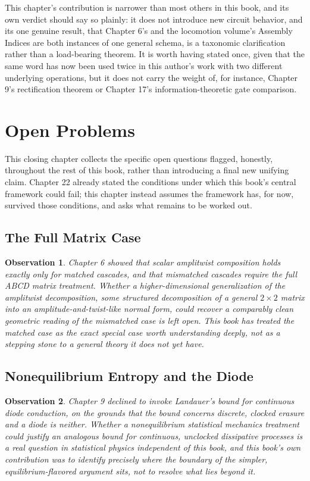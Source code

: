 \documentclass[12pt]{article}
\newtheorem{observation}{Observation}
\begin{document}
This chapter's contribution is narrower than most others in this book, and its own verdict should say so plainly: it does not introduce new circuit behavior, and its one genuine result, that Chapter 6's and the locomotion volume's Assembly Indices are both instances of one general schema, is a taxonomic clarification rather than a load-bearing theorem. It is worth having stated once, given that the same word has now been used twice in this author's work with two different underlying operations, but it does not carry the weight of, for instance, Chapter 9's rectification theorem or Chapter 17's information-theoretic gate comparison.

\section{Open Problems}

This closing chapter collects the specific open questions flagged, honestly, throughout the rest of this book, rather than introducing a final new unifying claim. Chapter 22 already stated the conditions under which this book's central framework could fail; this chapter instead assumes the framework has, for now, survived those conditions, and asks what remains to be worked out.

\subsection{The Full Matrix Case}

\begin{observation}
Chapter 6 showed that scalar amplitwist composition holds exactly only for matched cascades, and that mismatched cascades require the full ABCD matrix treatment. Whether a higher-dimensional generalization of the amplitwist decomposition, some structured decomposition of a general $2\times2$ matrix into an amplitude-and-twist-like normal form, could recover a comparably clean geometric reading of the mismatched case is left open. This book has treated the matched case as the exact special case worth understanding deeply, not as a stepping stone to a general theory it does not yet have.
\end{observation}

\subsection{Nonequilibrium Entropy and the Diode}

\begin{observation}
Chapter 9 declined to invoke Landauer's bound for continuous diode conduction, on the grounds that the bound concerns discrete, clocked erasure and a diode is neither. Whether a nonequilibrium statistical mechanics treatment could justify an analogous bound for continuous, unclocked dissipative processes is a real question in statistical physics independent of this book, and this book's own contribution was to identify precisely where the boundary of the simpler, equilibrium-flavored argument sits, not to resolve what lies beyond it.
\end{observation}
\end{document}
